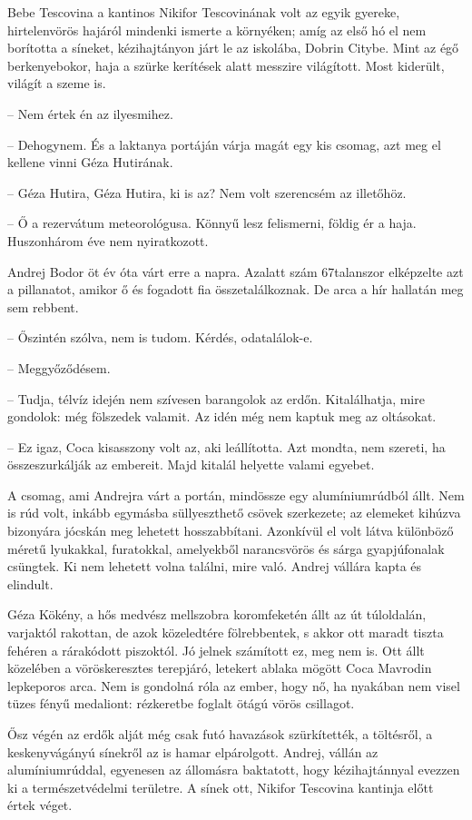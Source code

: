\documentclass{IEEEtran}
\begin{document}
Bebe Tescovina a kantinos Nikifor Tescovinának volt az egyik gyereke,
hirtelenvörös hajáról mindenki ismerte a környéken; amíg az első hó el nem
borította a síneket, kézihajtányon járt le az iskolába, Dobrin Citybe. Mint az
égő berkenyebokor, haja a szürke kerítések alatt messzire világított. Most
kiderült, világít a szeme is.

– Nem értek én az ilyesmihez.

– Dehogynem. És a laktanya portáján várja magát egy kis csomag, azt meg el
kellene vinni Géza Hutirának.

– Géza Hutira, Géza Hutira, ki is az? Nem volt szerencsém az illetőhöz.

– Ő a rezervátum meteorológusa. Könnyű lesz felismerni, földig ér a haja.
Huszonhárom éve nem nyiratkozott.

Andrej Bodor öt év óta várt erre a napra. Azalatt szám 67talanszor elképzelte
azt a pillanatot, amikor ő és fogadott fia összetalálkoznak. De arca a hír
hallatán meg sem rebbent.

– Őszintén szólva, nem is tudom. Kérdés, odatalálok-e.

– Meggyőződésem.

– Tudja, télvíz idején nem szívesen barangolok az erdőn. Kitalálhatja, mire
gondolok: még fölszedek valamit. Az idén még nem kaptuk meg az oltásokat.

– Ez igaz, Coca kisasszony volt az, aki leállította. Azt mondta, nem szereti,
ha összeszurkálják az embereit. Majd kitalál helyette valami egyebet.

A csomag, ami Andrejra várt a portán, mindössze egy alumíniumrúdból állt. Nem
is rúd volt, inkább egymásba süllyeszthető csövek szerkezete; az elemeket
kihúzva bizonyára jócskán meg lehetett hosszabbítani. Azonkívül el volt látva
különböző méretű lyukakkal, furatokkal, amelyekből narancsvörös és sárga
gyapjúfonalak csüngtek. Ki nem lehetett volna találni, mire való. Andrej
vállára kapta és elindult.

Géza Kökény, a hős medvész mellszobra koromfeketén állt az út túloldalán,
varjaktól rakottan, de azok közeledtére fölrebbentek, s akkor ott maradt
tiszta fehéren a rárakódott piszoktól. Jó jelnek számított ez, meg nem is. Ott
állt közelében a vöröskeresztes terepjáró, letekert ablaka mögött Coca
Mavrodin lepkeporos arca. Nem is gondolná róla az ember, hogy nő, ha nyakában
nem visel tüzes fényű medaliont: rézkeretbe foglalt ötágú vörös csillagot.

Ősz végén az erdők alját még csak futó havazások szürkítették, a töltésről, a
keskenyvágányú sínekről az is hamar elpárolgott. Andrej, vállán az
alumíniumrúddal, egyenesen az állomásra baktatott, hogy kézihajtánnyal evezzen
ki a természetvédelmi területre. A sínek ott, Nikifor Tescovina kantinja előtt
értek véget.
\end{document}
